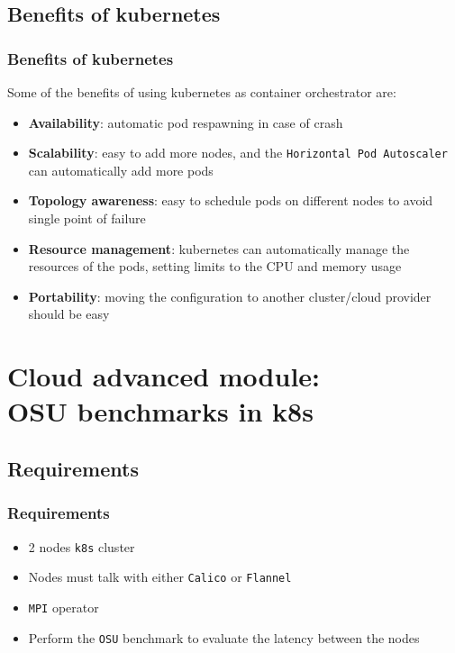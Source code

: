 \documentclass{beamer}
\let\oldtexttt\texttt
\renewcommand{\texttt}[1]{\textcolor{textttcolor}{\oldtexttt{#1}}}
\begin{document}
\subsection{Benefits of kubernetes}
\begin{frame}
    \frametitle{Benefits of kubernetes}
    Some of the benefits of using kubernetes as container orchestrator are: 
    \begin{itemize}
        \item \textbf{Availability}: automatic pod respawning in case of crash
        \item \textbf{Scalability}: easy to add more nodes, and the \texttt{Horizontal Pod Autoscaler} can automatically add more pods
        \item \textbf{Topology awareness}: easy to schedule pods on different nodes to avoid single point of failure
        \item \textbf{Resource management}: kubernetes can automatically manage the resources of the pods, setting limits to the CPU and memory usage
        \item \textbf{Portability}: moving the configuration to another cluster/cloud provider should be easy
    \end{itemize}
\end{frame}



\section{Cloud \textbf{advanced} module: \\OSU benchmarks in k8s}

\subsection{Requirements}
\begin{frame}
    \frametitle{Requirements}
    \begin{itemize}
        \item 2 nodes \texttt{k8s} cluster
        \item Nodes must talk with either \texttt{Calico} or \texttt{Flannel}
        \item \texttt{MPI} operator
        \item Perform the \texttt{OSU} benchmark to evaluate the latency between the nodes
    \end{itemize}
\end{frame}
\end{document}

